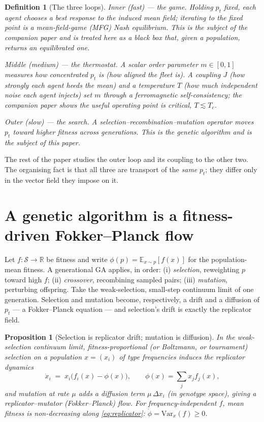 \documentclass[11pt]{article}
\newtheorem{proposition}{Proposition}
\newtheorem{definition}{Definition}
\newcommand{\E}{\mathbb{E}}
\newcommand{\R}{\mathbb{R}}
\begin{document}
\begin{definition}[The three loops]
\label{def:loops}
\emph{Inner (fast) --- the game.} Holding $p_t$ fixed, each agent chooses a best response to the induced mean
field; iterating to the fixed point is a mean-field-game (MFG) Nash equilibrium. This is the subject of the
companion paper \cite{hanzo-mean-field-alignment} and is treated here as a black box that, given a
population, returns an equilibrated one.

\emph{Middle (medium) --- the thermostat.} A scalar \emph{order parameter} $m \in [0,1]$ measures how
concentrated $p_t$ is (how aligned the fleet is). A coupling $J$ (how strongly each agent heeds the mean) and
a temperature $T$ (how much independent noise each agent injects) set $m$ through a ferromagnetic
self-consistency; the companion paper shows the useful operating point is \emph{critical}, $T \lesssim T_c$.

\emph{Outer (slow) --- the search.} A selection--recombination--mutation operator moves $p_t$ toward higher
fitness across \emph{generations}. This is the genetic algorithm and is the subject of this paper.
\end{definition}

The rest of the paper studies the outer loop and its coupling to the other two. The organising fact is that
all three are transport of the \emph{same} $p_t$; they differ only in the vector field they impose on it.

\section{A genetic algorithm is a fitness-driven Fokker--Planck flow}
\label{sec:ga-fpk}

Let $f:\mathcal{S}\to\R$ be fitness and write $\phi(p)=\E_{x\sim p}[f(x)]$ for the population-mean fitness.
A generational GA applies, in order: (i) \emph{selection}, reweighting $p$ toward high $f$; (ii)
\emph{crossover}, recombining sampled pairs; (iii) \emph{mutation}, perturbing offspring. Take the
weak-selection, small-step continuum limit of one generation. Selection and mutation become, respectively, a
drift and a diffusion of $p_t$ --- a Fokker--Planck equation --- and selection's drift is exactly the
replicator field.

\begin{proposition}[Selection is replicator drift; mutation is diffusion]
\label{prop:replicator}
In the weak-selection continuum limit, fitness-proportional (or Boltzmann, or tournament) selection on a
population $x=(x_i)$ of type frequencies induces the replicator dynamics \cite{taylor1978,hofbauer1998}
\begin{equation}
\dot{x}_i \;=\; x_i\bigl(f_i(x) - \phi(x)\bigr), \qquad \phi(x)=\sum_j x_j f_j(x),
\label{eq:replicator}
\end{equation}
and mutation at rate $\mu$ adds a diffusion term $\mu\,\Delta x_i$ (in genotype space), giving a
replicator--mutator (Fokker--Planck) flow. For frequency-independent $f$, mean fitness is non-decreasing
along \eqref{eq:replicator}: $\dot{\phi} = \mathrm{Var}_x(f) \ge 0$.
\end{proposition}
\end{document}
